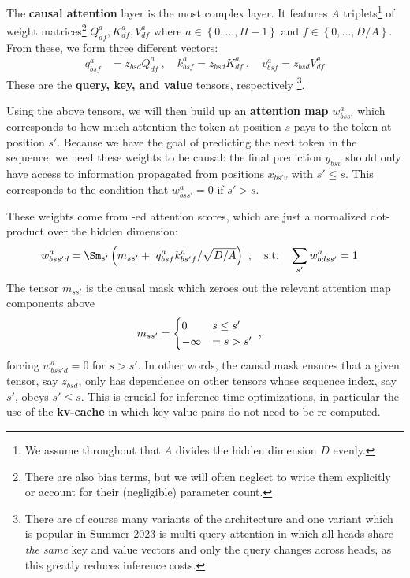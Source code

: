 \documentclass[11pt]{article}
\begin{document}
The \textbf{causal attention} layer is the most complex layer. It features $ A $  triplets\footnote{
We assume throughout that $ A $ divides the hidden dimension $ D $ evenly.} of weight
matrices\footnote{There are also bias terms, but we will often neglect to write them explicitly or
    account for their (negligible)
parameter count.}  $ Q ^{ a } _{ d f }, K ^{ a } _{ df }, V ^{ a } _{ df }  $
where $ a \in \left \{ 0, \ldots, H-1 \right \} $ and $ f \in \left \{ 0, \ldots, D/A \right \} $.
From these, we form three different vectors:
\begin{align}
  q ^{ a }_{ bsf } &= z _{ bsd } Q ^{ a }_{ df } \ , \quad
  k ^{ a }_{ bsf } = z _{ bsd } K ^{ a }_{ df }  \ , \quad
  v ^{ a }_{ bsf } = z _{ bsd } V ^{ a }_{ df }
\end{align}
These are the \textbf{query, key, and value} tensors, respectively \footnote{There are of course
many variants of the architecture and one variant which is popular in Summer 2023 is multi-query
attention \cite{shazeer2019fast} in which all heads share \textit{the same} key and value vectors
and only the query changes across heads, as this greatly reduces inference costs.}.

Using the above tensors, we will then build up an \textbf{attention map}  $ w ^{ a }_{ bss' } $
which corresponds to how much attention the token at position $ s $ pays to the token at
position $ s' $.  Because we have the goal of predicting the
next token in the sequence, we need these weights to be causal: the final prediction $ y _{ bsv } $
should only have access to information propagated from positions $ x _{ bs'v } $ with $ s' \le s $.
This corresponds to the condition that $ w ^{ a }_{ bss' } = 0  $ if  $ s' > s  $.

 These weights come from -ed attention scores, which are just a normalized
 dot-product over the hidden dimension:
\begin{align}
    w ^{ a }_{ bss'd } &=\Sm _{ s' } \left (m _{ s s' }+\ q ^{ a }_{ bsf }k ^{ a }_{ bs'f } / \sqrt{D/A} \right
        )\ ,  \quad {\rm s.t.} \quad \sum_{s'}w ^{ a }_{ bdss' } =1
\end{align}
The tensor $ m _{  s s' } $ is the causal mask which zeroes out the relevant attention map
components above
\begin{align}
    m _{ s s' } &= \begin{cases}
            0 & s \le s' \nonumber\\
            -\infty &= s > s'
        \end{cases}\ ,
\end{align}
forcing $ w ^{ a  } _{ bss'd } =0$ for $ s> s' $. In other words, the causal mask ensures that a
given tensor, say $ z _{ bsd } $, only has dependence on other tensors whose sequence index, say $
s' $, obeys $ s' \le s $.  This is crucial for inference-time optimizations, in particular the use
of the \textbf{kv-cache} in which key-value pairs do not need to be re-computed.
\end{document}
